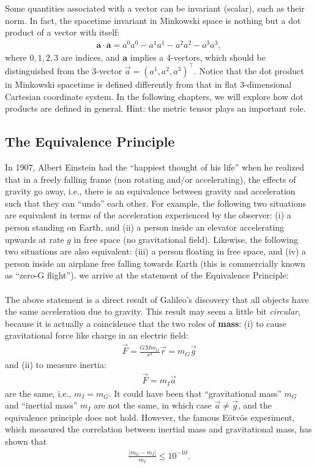 \documentclass{article}
\theoremstyle{definition}
\begin{document}
Some quantities associated with a vector can be invariant (scalar), such as their norm. In fact, the spacetime invariant in Minkowski space is nothing but a dot product of a vector with itself:
\begin{align*}
\mathbf{a}\cdot\mathbf{a} = a^0a^0 - a^1a^1 - a^2a^2 - a^3a^3,
\end{align*}
where $0,1,2,3$ are indices, and $\mathbf{a}$ implies a 4-vectors, which should be distinguished from the 3-vector $\vec{a} = (a^1,a^2,a^3)^\top$. Notice that the dot product in Minkowski spacetime is defined differently from that in flat 3-dimensional Cartesian coordinate system. In the following chapters, we will explore how dot products are defined in general. Hint: the metric tensor plays an important role.\\ 


\subsection{The Equivalence Principle}
In 1907, Albert Einstein had the ``happiest thought of his life'' when he realized that in a freely falling frame (non rotating and/or accelerating), the effects of gravity go away, i.e., there is an equivalence between gravity and acceleration such that they can ``undo'' each other. For example, the following two situations are equivalent in terms of the acceleration experienced by the observer: (i) a person standing on Earth, and (ii) a person inside an elevator accelerating upwards at rate $g$ in free space (no gravitational field). Likewise, the following two situations are also equivalent: (iii) a person floating in free space, and (iv) a person inside an airplane free falling towards Earth (this is commercially known as ``zero-G flight''). we arrive at the statement of the Equivalence Principle: \\

\noindent {}\\

The above statement is a direct result of Galileo's discovery that all objects have the same acceleration due to gravity. This result may seem a little bit \textit{circular}, because it is actually a coincidence that the two roles of \textbf{mass}: (i) to cause gravitational force like charge in an electric field:
\begin{align*}
\vec{F} = \frac{GMm_G}{r^3}\vec{r} = m_G\vec{g}
\end{align*}
and (ii) to measure inertia:
\begin{align*}
\vec{F} = m_I\vec{a}
\end{align*}
are the same, i.e., $m_I = m_G$. It could have been that ``gravitational mass'' $m_G$ and ``inertial mass'' $m_I$ are not the same, in which case $\vec{a} \neq \vec{g}$, and the equivalence principle does not hold. However, the famous E\"{o}tv\"{o}s experiment, which measured the correlation between inertial mass and gravitational mass, has shown that
\begin{align*}
\frac{\vert m_G - m_I\vert}{m_I} \leq 10^{-10}.
\end{align*}
\end{document}
